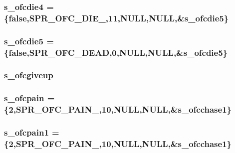\label{WL__ACT2_8C_a96f032403c7e400bb6aa696b73e8a7bc}
\hypertarget{WL__ACT2_8C_abf176bf01baaa0866bb02f9c0a3b8da8}{
\subsubsection[{s\_\-ofcdie4}]{ {\bf s\_\-ofcdie4} = \{false,SPR\_\-OFC\_\-DIE\_,11,NULL,NULL,\&{\bf s\_\-ofcdie5}\}}}
\label{WL__ACT2_8C_abf176bf01baaa0866bb02f9c0a3b8da8}
\hypertarget{WL__ACT2_8C_a7927a2719c846f03fc74f6c1efddacf4}{
\subsubsection[{s\_\-ofcdie5}]{ {\bf s\_\-ofcdie5} = \{false,SPR\_\-OFC\_\-DEAD,0,NULL,NULL,\&{\bf s\_\-ofcdie5}\}}}
\label{WL__ACT2_8C_a7927a2719c846f03fc74f6c1efddacf4}
\hypertarget{WL__ACT2_8C_a8bf52496d133d46dd7ec3ab0f367a44f}{
\subsubsection[{s\_\-ofcgiveup}]{ {\bf s\_\-ofcgiveup}}}
\label{WL__ACT2_8C_a8bf52496d133d46dd7ec3ab0f367a44f}
\hypertarget{WL__ACT2_8C_acd795aa968a47e77109d917e6539e2b1}{
\subsubsection[{s\_\-ofcpain}]{ {\bf s\_\-ofcpain} = \{2,SPR\_\-OFC\_\-PAIN\_,10,NULL,NULL,\&{\bf s\_\-ofcchase1}\}}}
\label{WL__ACT2_8C_acd795aa968a47e77109d917e6539e2b1}
\hypertarget{WL__ACT2_8C_aa5e50151f6cdf0e49996440f74ad691d}{
\subsubsection[{s\_\-ofcpain1}]{ {\bf s\_\-ofcpain1} = \{2,SPR\_\-OFC\_\-PAIN\_,10,NULL,NULL,\&{\bf s\_\-ofcchase1}\}}}
